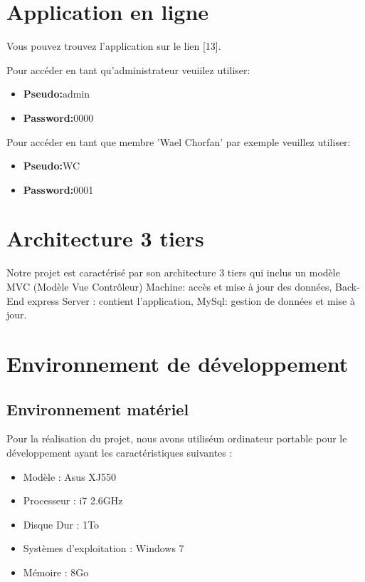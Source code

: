 \section{Application en ligne}
Vous pouvez trouvez l'application sur le lien [13].


  Pour acc\'{e}der en tant qu'administrateur veuiilez utiliser:

  \begin{itemize}
    \item {\textbf{ Pseudo:}admin}
    \item {\textbf{ Password:}0000}
  \end{itemize}


  Pour acc\'{e}der en tant que membre 'Wael Chorfan' par exemple veuillez utiliser:

  \begin{itemize}
    \item {\textbf{ Pseudo:}WC}
    \item {\textbf{ Password:}0001}
  \end{itemize}

 \newpage



 \section{ Architecture 3 tiers}

Notre projet est caract\'{e}ris\'{e} par son architecture 3 tiers qui inclus un mod\`{e}le MVC (Mod\`{e}le
Vue Contr\^{o}leur)
\textbullet{} Machine: acc\`{e}s et mise \`{a} jour des donn\'{e}es,
\textbullet{} Back-End express Server : contient l'application,
\textbullet{} MySql: gestion de donn\'{e}es et mise \`{a} jour.


\section{Environnement de d\'{e}veloppement}

  \subsection{Environnement mat\'{e}riel }

  Pour la r\'{e}alisation du projet, nous avons utilis\'{e}un ordinateur
  portable pour le d\'{e}veloppement ayant les caract\'{e}ristiques suivantes :

\begin{itemize}
  \item {  Mod\`{e}le : Asus XJ550 }
  \item {Processeur : i7 2.6GHz }
  \item {Disque Dur : 1To }
  \item { Syst\`{e}mes d'exploitation : Windows 7  }
  \item {M\'{e}moire : 8Go}

\end{itemize}





